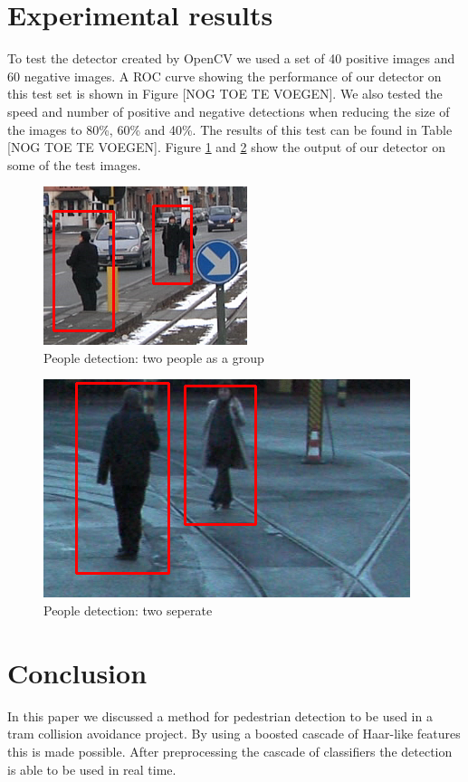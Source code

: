 \documentclass{article}
\begin{document}
\section{Experimental results}
To test the detector created by OpenCV we used a set of 40 positive images and 60 negative images. A ROC curve showing the performance of our detector on this test set is shown in Figure [NOG TOE TE VOEGEN]. We also tested the speed and number of positive and negative detections when reducing the size of the images to 80\%, 60\% and 40\%. The results of this test can be found in Table [NOG TOE TE VOEGEN]. Figure \ref{fig:pdetection1} and \ref{fig:pdetection2} show the output of our detector on some of the test images.
\begin{figure}[h!]
	\centering
	\includegraphics[scale=0.6]{peopledetection1.png}
	\caption{People detection: two people as a group}
	\label{fig:pdetection1}
\end{figure}
\begin{figure}[h!]
	\centering
	\includegraphics[scale=0.4]{peopledetection2.png}
	\caption{People detection: two seperate}
	\label{fig:pdetection2}
\end{figure}
\section{Conclusion}
In this paper we discussed a method for pedestrian detection to be used in a tram collision avoidance project. By using a boosted cascade of Haar-like features this is made possible. After preprocessing the cascade of classifiers the detection is able to be used in real time.


\end{document}
